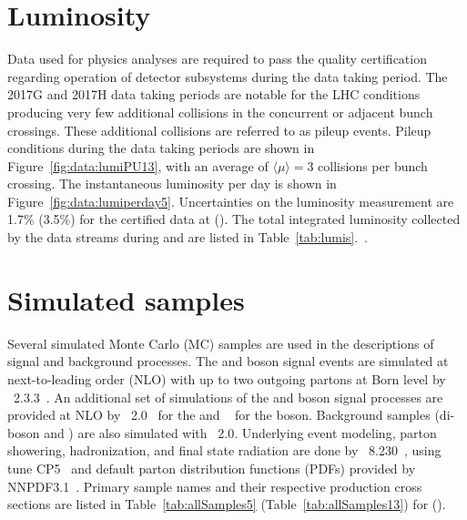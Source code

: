 \section{Luminosity}\label{ch:lumi}
Data used for physics analyses are required to pass the quality certification regarding operation of detector subsystems during the data taking period. 
%
The 2017G and 2017H data taking periods are notable for the LHC conditions producing very few additional collisions in the concurrent or adjacent bunch crossings. These additional collisions are referred to as pileup events. Pileup conditions during the data taking periods are shown in Figure~\ref{fig:data:lumiPU13}, with an average of $\langle\mu\rangle=3$ collisions per bunch crossing. The instantaneous luminosity per day is shown in Figure~\ref{fig:data:lumiperday5}. Uncertainties on the luminosity measurement are 1.7\% (3.5\%) for the certified data at \sh (\sg). The total integrated luminosity collected by the data streams during \sg and \sh are listed in Table~\ref{tab:lumis}.~\cite{LumiCalibTwiki,CMS:2018elu}.







\section{Simulated samples}\label{ch:data:sim}
Several simulated Monte Carlo (MC) samples are used in the descriptions of signal and background processes. The \Wpm and \Z boson signal events are simulated at next-to-leading order (NLO) with up to two outgoing partons at Born level by \MGvATNLO~2.3.3~\cite{Alwall:2014hca}. An additional set of simulations of the \Wpm and \Z boson signal processes are provided at NLO by \POWHEG~2.0~\cite{Alioli:2008gx,Frixione:2007vw,powheg:2010,Alioli:2010xd} for the \Wpm and \MINLO~\cite{Hamilton:2012rf} for the \Z boson. Background samples (di-boson and \ttbar) are also simulated with \POWHEG~2.0. Underlying event modeling, parton showering, hadronization, and final state radiation are done by \PYTHIA~8.230~\cite{Sjostrand:2014zea}, using tune CP5~\cite{Sirunyan:2019dfx} and default parton distribution functions (PDFs) provided by NNPDF3.1~\cite{Ball:2017nwa}. Primary sample names and their respective production cross sections are listed in Table~\ref{tab:allSamples5} (Table~\ref{tab:allSamples13}) for \sg (\sh).

